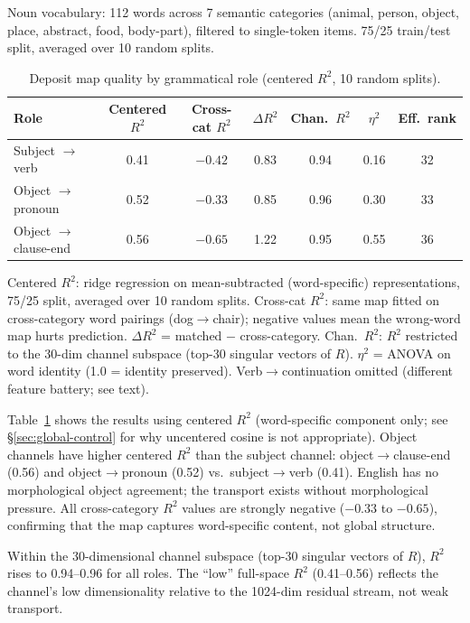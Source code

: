 \documentclass[11pt,a4paper]{article}
\begin{document}
Noun vocabulary: 112 words across 7 semantic categories (animal, person, object, place,
abstract, food, body-part), filtered to single-token items. 75/25 train/test split, averaged
over 10 random splits.

\begin{table}[t]
\centering
\caption{Deposit map quality by grammatical role (centered $R^2$, 10 random splits).}
\label{tab:role-comparison}
\begin{tabular}{lcccccc}
\toprule
Role & Centered $R^2$ & Cross-cat $R^2$ & $\Delta R^2$ & Chan.\ $R^2$ & $\eta^2$ & Eff.\ rank \\
\midrule
Subject $\to$ verb       & 0.41 & $-0.42$ & 0.83 & 0.94 & 0.16 & 32 \\
Object $\to$ pronoun     & 0.52 & $-0.33$ & 0.85 & 0.96 & 0.30 & 33 \\
Object $\to$ clause-end  & 0.56 & $-0.65$ & 1.22 & 0.95 & 0.55 & 36 \\
\bottomrule
\end{tabular}

\smallskip\small
Centered $R^2$: ridge regression on mean-subtracted (word-specific) representations, 75/25
split, averaged over 10 random splits. Cross-cat $R^2$: same map fitted on cross-category
word pairings (dog$\to$chair); negative values mean the wrong-word map hurts prediction.
$\Delta R^2$ = matched $-$ cross-category. Chan.\ $R^2$: $R^2$ restricted to the 30-dim
channel subspace (top-30 singular vectors of $R$). $\eta^2$ = ANOVA on word identity (1.0 =
identity preserved). Verb$\to$continuation omitted (different feature battery; see text).
\end{table}

Table~\ref{tab:role-comparison} shows the results using centered $R^2$ (word-specific
component only; see \S\ref{sec:global-control} for why uncentered cosine is not appropriate).
Object channels have higher centered $R^2$ than the subject channel:
object$\to$clause-end (0.56) and object$\to$pronoun (0.52) vs.\ subject$\to$verb (0.41).
English has no morphological object agreement; the transport exists without morphological
pressure. All cross-category $R^2$ values are strongly negative ($-0.33$ to $-0.65$),
confirming that the map captures word-specific content, not global structure.

Within the 30-dimensional channel subspace (top-30 singular vectors of $R$), $R^2$ rises to
0.94--0.96 for all roles. The ``low'' full-space $R^2$ (0.41--0.56) reflects the channel's
low dimensionality relative to the 1024-dim residual stream, not weak transport.
\end{document}
